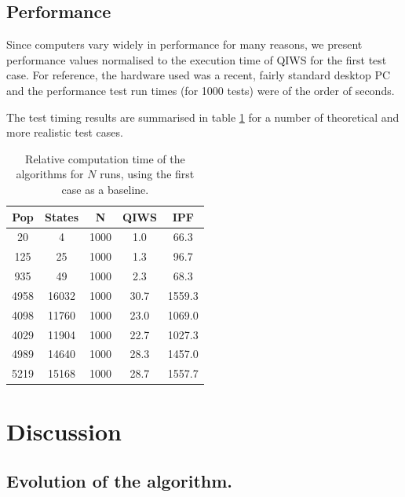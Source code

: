 \documentclass{JASSS}
\begin{document}
\subsection{Performance}\label{performance}

Since computers vary widely in performance for many reasons, we present
performance values normalised to the execution time of QIWS for the first test case. For reference, the hardware used was a recent, fairly standard desktop PC and the performance test run times (for 1000 tests) were of the order of seconds.

The test timing results are summarised in table \ref{tab2} for a number of theoretical and more realistic test cases.



\begin{table}[!t]
	\centering
	\begin{tabular}{c|c|c|c|c}
	\toprule
	Pop & States & N & QIWS & IPF\tabularnewline
	\midrule
	20 & 4 & 1000 & 1.0 & 66.3\tabularnewline
	125 & 25 & 1000 & 1.3 & 96.7\tabularnewline
	935 & 49 & 1000 & 2.3 & 68.3\tabularnewline
	4958 & 16032 & 1000 & 30.7 & 1559.3\tabularnewline
	4098 & 11760 & 1000 & 23.0 & 1069.0\tabularnewline
	4029 & 11904 & 1000 & 22.7 & 1027.3\tabularnewline
	4989 & 14640 & 1000 & 28.3 & 1457.0\tabularnewline
	5219 & 15168 & 1000 & 28.7 & 1557.7\tabularnewline
	\bottomrule			
	\end{tabular}
	\caption{Relative computation time of the algorithms for \(N\) runs, using the first case as a baseline.}
	\label{tab2}	
\end{table}

\section{Discussion}\label{discussion}

\subsection{Evolution of the algorithm.}\label{evolution-of-the-algorithm.}

\end{document}
